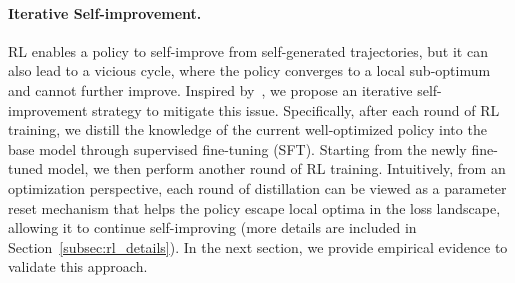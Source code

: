 \paragraph{Iterative Self-improvement.}
RL enables a policy to self-improve from self-generated trajectories, but it can also lead to a vicious cycle, where the policy converges to a local sub-optimum and cannot further improve. Inspired by~\cite{agarwal2022reincarnating,schmitt2018kickstarting}, we propose an iterative self-improvement strategy to mitigate this issue. Specifically, after each round of RL training, we distill the knowledge of the current well-optimized policy into the base model through supervised fine-tuning (SFT). Starting from the newly fine-tuned model, we then perform another round of RL training. Intuitively, from an optimization perspective, each round of distillation can be viewed as a parameter reset mechanism that helps the policy escape local optima in the loss landscape, allowing it to continue self-improving (more details are included in Section~\ref{subsec:rl_details}). In the next section, we provide empirical evidence to validate this approach.
